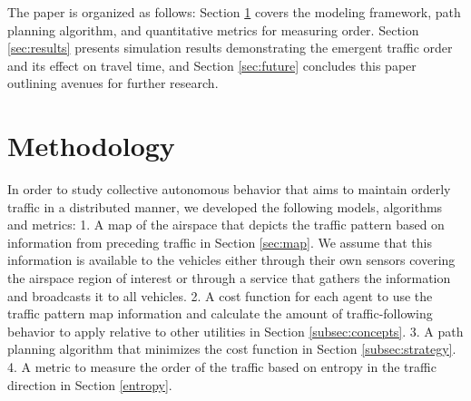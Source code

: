 \documentclass[conference, letter]{IEEEtran}
\begin{document}
The paper is organized as follows: Section \ref{sec:Method} covers the modeling framework, path planning algorithm, and quantitative metrics for measuring order. Section \ref{sec:results} presents simulation results demonstrating the emergent traffic order and its effect on travel time, and Section \ref{sec:future} concludes this paper outlining avenues for further research. 


\section{Methodology}\label{sec:Method}


In order to study collective autonomous behavior that aims to maintain orderly traffic in a distributed manner, we developed the following models, algorithms and metrics:
1. A map of the airspace that depicts the traffic pattern based on information from preceding traffic in Section \ref{sec:map}. We assume that this information is available to the vehicles either through their own sensors covering the airspace region of interest or through a service that gathers the information and broadcasts it to all vehicles. 
2. A cost function for each agent to use the traffic pattern map information and calculate the amount of traffic-following behavior to apply relative to other utilities in Section \ref{subsec:concepts}. 
3. A path planning algorithm that minimizes the cost function in Section \ref{subsec:strategy}.
4. A metric to measure the order of the traffic based on entropy in the traffic direction in Section \ref{entropy}.

\vspace{-0.1cm}
\end{document}
